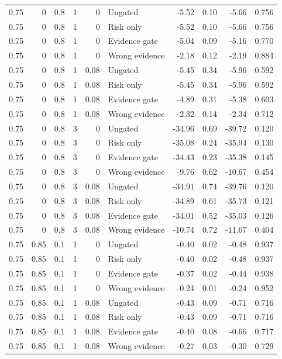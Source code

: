 \begin{longtable}{rrrrrlrrrr}
0.75 & 0 & 0.8 & 1 & 0 & Ungated & -5.52 & 0.10 & -5.66 & 0.756\\
0.75 & 0 & 0.8 & 1 & 0 & Risk only & -5.52 & 0.10 & -5.66 & 0.756\\
0.75 & 0 & 0.8 & 1 & 0 & Evidence gate & -5.04 & 0.09 & -5.16 & 0.770\\
0.75 & 0 & 0.8 & 1 & 0 & Wrong evidence & -2.18 & 0.12 & -2.19 & 0.884\\
0.75 & 0 & 0.8 & 1 & 0.08 & Ungated & -5.45 & 0.34 & -5.96 & 0.592\\
0.75 & 0 & 0.8 & 1 & 0.08 & Risk only & -5.45 & 0.34 & -5.96 & 0.592\\
0.75 & 0 & 0.8 & 1 & 0.08 & Evidence gate & -4.89 & 0.31 & -5.38 & 0.603\\
0.75 & 0 & 0.8 & 1 & 0.08 & Wrong evidence & -2.32 & 0.14 & -2.34 & 0.712\\
0.75 & 0 & 0.8 & 3 & 0 & Ungated & -34.96 & 0.69 & -39.72 & 0.120\\
0.75 & 0 & 0.8 & 3 & 0 & Risk only & -35.08 & 0.24 & -35.94 & 0.130\\
0.75 & 0 & 0.8 & 3 & 0 & Evidence gate & -34.43 & 0.23 & -35.38 & 0.145\\
0.75 & 0 & 0.8 & 3 & 0 & Wrong evidence & -9.76 & 0.62 & -10.67 & 0.454\\
0.75 & 0 & 0.8 & 3 & 0.08 & Ungated & -34.91 & 0.74 & -39.76 & 0.120\\
0.75 & 0 & 0.8 & 3 & 0.08 & Risk only & -34.89 & 0.61 & -35.73 & 0.121\\
0.75 & 0 & 0.8 & 3 & 0.08 & Evidence gate & -34.01 & 0.52 & -35.03 & 0.126\\
0.75 & 0 & 0.8 & 3 & 0.08 & Wrong evidence & -10.74 & 0.72 & -11.67 & 0.404\\
0.75 & 0.85 & 0.1 & 1 & 0 & Ungated & -0.40 & 0.02 & -0.48 & 0.937\\
0.75 & 0.85 & 0.1 & 1 & 0 & Risk only & -0.40 & 0.02 & -0.48 & 0.937\\
0.75 & 0.85 & 0.1 & 1 & 0 & Evidence gate & -0.37 & 0.02 & -0.44 & 0.938\\
0.75 & 0.85 & 0.1 & 1 & 0 & Wrong evidence & -0.24 & 0.01 & -0.24 & 0.952\\
0.75 & 0.85 & 0.1 & 1 & 0.08 & Ungated & -0.43 & 0.09 & -0.71 & 0.716\\
0.75 & 0.85 & 0.1 & 1 & 0.08 & Risk only & -0.43 & 0.09 & -0.71 & 0.716\\
0.75 & 0.85 & 0.1 & 1 & 0.08 & Evidence gate & -0.40 & 0.08 & -0.66 & 0.717\\
0.75 & 0.85 & 0.1 & 1 & 0.08 & Wrong evidence & -0.27 & 0.03 & -0.30 & 0.729\\

\end{longtable}
